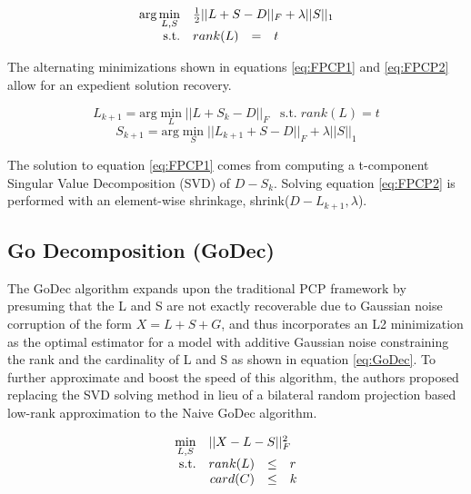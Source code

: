 \documentclass[conference]{IEEEtran}
\begin{document}
\begin{equation} \label{eq:FPCP}
\begin{array}{rrclcl}
\textrm{arg} \displaystyle \min_{L,S} & \multicolumn{3}{l}{\frac{1}{2}||L+S-D||_F + \lambda ||S||_1} \\
\textrm{s.t.} & rank(L) & = & t \\
\end{array}
\end{equation}

The alternating minimizations shown in equations \ref{eq:FPCP1} and \ref{eq:FPCP2} allow for an expedient solution recovery.

\begin{equation} \label{eq:FPCP1}
L_{k+1} = \textrm{arg} \displaystyle \min_{L} ||L+S_k-D||_F \;\;\; \textrm{s.t.} \; rank(L) = t
\end{equation}
\begin{equation} \label{eq:FPCP2}
S_{k+1} = \textrm{arg} \displaystyle \min_{S} ||L_{k+1}+S-D||_F  + \lambda ||S||_1
\end{equation}

The solution to equation \ref{eq:FPCP1} comes from computing a t-component Singular Value Decomposition (SVD) of $D- S_k$. Solving equation \ref{eq:FPCP2} is performed with an element-wise shrinkage, shrink($D-L_{k+1},\lambda$). 




\subsection{Go Decomposition (GoDec) \cite{GoDec}}
The GoDec algorithm expands upon the traditional PCP framework by presuming that the L and S are not exactly recoverable due to Gaussian noise corruption of the form  $ X = L + S + G$, and thus incorporates an L2 minimization as the optimal estimator for a model with additive Gaussian noise constraining the rank and the cardinality of L and S as shown in equation \ref{eq:GoDec}. To further approximate and boost the speed of this algorithm, the authors proposed replacing the SVD solving method in lieu of a bilateral random projection based low-rank approximation to the Naive GoDec algorithm.

\begin{equation} \label{eq:GoDec}
\begin{array}{rrclcl}
\displaystyle \min_{L,S} & \multicolumn{3}{l}{||X-L-S||_F^2} \\
\textrm{s.t.} & rank(L) & \leq & r \\
                   & card(C) & \leq & k \\
\end{array}
\end{equation}
\end{document}
